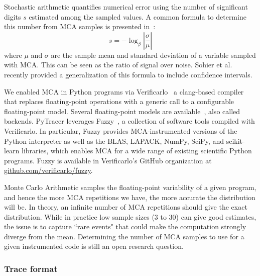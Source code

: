 \documentclass[10pt,journal,compsoc]{IEEEtran}
\newcommand{\pytracer}[0]{PyTracer\xspace}
\DeclareRobustCommand{\add}[1]{\textcolor{ao(english)}{#1}}%
\DeclareRobustCommand{\add}[1]{#1}
\begin{document}
Stochastic arithmetic quantifies numerical error using the number of significant
digits $s$ estimated among the sampled values. A common formula to determine
this number from MCA samples is presented in~\cite{parker1997monte}:
\begin{equation}
    s = -\log_{\beta}{ \left| \dfrac{\sigma}{\mu} \right|} \label{eq:sig-digits}
\end{equation}
where $\mu$ and $\sigma$ are the sample mean and standard deviation of a
variable sampled with MCA. \add{This can be seen as the ratio of signal over noise.}
Sohier et al.~\cite{sohier2021confidence} recently provided a generalization of
this formula to include confidence intervals.

We enabled MCA in Python programs via Verificarlo~\cite{verificarlo} a
clang-based compiler~\cite{lattner2008llvm} that replaces floating-point
operations with a generic call to a configurable floating-point model. Several
floating-point models are
available~\cite{chatelain2019automatic,chatelain2019outils}, also called
backends. \pytracer leverages Fuzzy~\cite{kiar2020comparing}, a collection of
software tools compiled with Verificarlo. In particular, Fuzzy provides
MCA-instrumented versions of the Python interpreter as well as the BLAS, LAPACK,
NumPy, SciPy, and scikit-learn libraries, which enables MCA for a wide range of
existing scientific Python programs. Fuzzy is available in Verificarlo's GitHub
organization at
\href{https://github.com/verificarlo/fuzzy}{\url{github.com/verificarlo/fuzzy}}.


\add{Monte Carlo Arithmetic samples the floating-point variability of a given
    program, and hence the more MCA repetitions we have, the more accurate the
    distribution will be. In theory, an infinite number of MCA repetitions
    should give the exact distribution. While in practice low sample sizes (3 to 30)
    can give good estimates, the issue is to capture ``rare events" that could make the
    computation strongly diverge from the mean. Determining the number of
    MCA samples to use for a given instrumented code is still an open research question. 
}

\subsubsection{Trace format}
\end{document}

